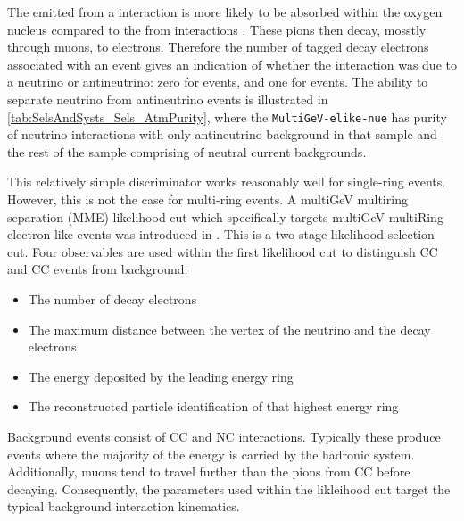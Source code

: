 The \quickmath{\pi^{-}} emitted from a  interaction is more likely to be absorbed within the oxygen nucleus compared to the \quickmath{\pi^{+}} from  interactions \cite{LeeKaPik}. These pions then decay, mosstly through muons, to electrons. Therefore the number of tagged decay electrons associated with an event gives an indication of whether the interaction was due to a neutrino or antineutrino: zero for  events, and one for  events. The ability to separate neutrino from antineutrino events is illustrated in \autoref{tab:SelsAndSysts_Sels_AtmPurity}, where the \texttt{MultiGeV-elike-nue} has  purity of neutrino interactions with only  antineutrino background in that sample and the rest of the sample comprising of neutral current backgrounds.

This relatively simple discriminator works reasonably well for single-ring events. However, this is not the case for multi-ring events. A multiGeV multiring separation (MME) likelihood cut which specifically targets multiGeV multiRing electron-like events was introduced in \cite{PhysRevD.81.092004, PhysRevD.74.032002}. This is a two stage likelihood selection cut. Four observables are used within the first likelihood cut to distinguish CC and CC events from background:

\begin{itemize}
\item The number of decay electrons
\item The maximum distance between the vertex of the neutrino and the decay electrons
\item The energy deposited by the leading energy ring
\item The reconstructed particle identification of that highest energy ring
\end{itemize}

Background events consist of CC\quickmath{\nu_{\mu}} and NC interactions. Typically these produce events where the majority of the energy is carried by the hadronic system. Additionally, muons tend to travel further than the pions from CC before decaying. Consequently, the parameters used within the likleihood cut target the typical background interaction kinematics.

